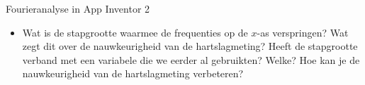 \begin{opdracht}{Fourieranalyse in App Inventor 2}
\begin{itemize}
	Voor de roodwaarden in het voorbeeld CSV-bestand zou je een grafiek moeten zien zoals hieronder: 
	
	
	In dit geval is de meest waarschijnlijke hartslag ongeveer 75 bpm.
	
	\item Wat is de stapgrootte waarmee de frequenties op de $x$-as verspringen? Wat zegt dit over de nauwkeurigheid van de hartslagmeting? Heeft de stapgrootte verband met een variabele die we eerder al gebruikten? Welke? Hoe kan je de nauwkeurigheid van de hartslagmeting verbeteren?
\end{itemize}
\end{opdracht}






